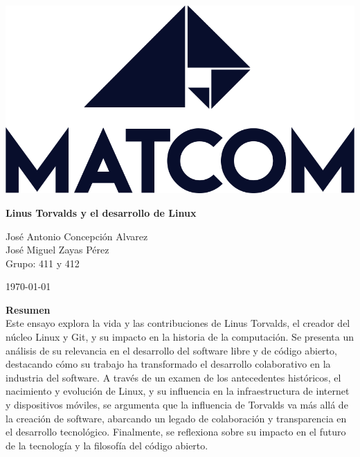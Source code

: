 \documentclass[a4paper,12pt]{article}
\begin{document}
\begin{titlepage}
    \centering
    

    \vspace{1cm}
    \newpage
    \begin{center}
        \includegraphics[scale=0.2]{images/Matcom-UnaTinta-Black.png}
    \end{center}
    
    {\Huge \textbf{Linus Torvalds y el desarrollo de Linux}}\\
    \vspace{0.5cm}
    
    {\Large José Antonio Concepción Alvarez \\  José Miguel Zayas Pérez \\ Grupo: 411 y 412}
    
    {\large \today}
   \thispagestyle{empty} 
\end{titlepage}

\renewcommand{\refname}{Bibliografía y Anexos}



\begin{centering}
    \vspace{2cm}
    \textbf{Resumen}\\
    Este ensayo explora la vida y las contribuciones de Linus Torvalds, el
    creador del núcleo Linux y Git, y su impacto en la historia de la
    computación. Se presenta un análisis de su relevancia en el desarrollo del
    software libre y de código abierto, destacando cómo su trabajo ha
    transformado el desarrollo colaborativo en la industria del software. A
    través de un examen de los antecedentes históricos, el nacimiento y
    evolución de Linux, y su influencia en la infraestructura de internet y
    dispositivos móviles, se argumenta que la influencia de Torvalds va más allá
    de la creación de software, abarcando un legado de colaboración y
    transparencia en el desarrollo tecnológico. Finalmente, se reflexiona sobre
    su impacto en el futuro de la tecnología y la filosofía del código abierto.
\end{centering}
\newpage
\end{document}
